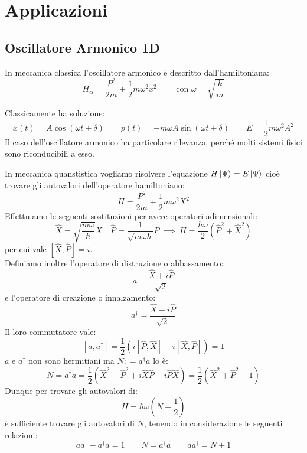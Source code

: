 

\section{Applicazioni}

\subsection{Oscillatore Armonico 1D} 
In meccanica classica l'oscillatore armonico è descritto dall'hamiltoniana:
\[
    H_{cl} = \frac{P^2}{2m} + \frac{1}{2}m \omega^2 x^2 \qquad \text{ con } \omega = \sqrt{\frac{k}{m}}
\]

Classicamente ha soluzione:
\[
    x(t) = A\cos(\omega t + \delta) \qquad p(t) = - m\omega A \sin(\omega t + \delta) \qquad E = \frac{1}{2} m \omega^2 A^2
\]
Il caso dell'oscillatore armonico ha particolare rilevanza, perché molti sistemi fisici sono riconducibili a esso.

In meccanica quanstistica vogliamo risolvere l'equazione \(H\ket{\Psi} = E\ket{\Psi}\) cioè trovare gli autovalori dell'operatore hamiltoniano:
\begin{equation}
    H = \frac{P^2}{2m} + \frac{1}{2} m \omega^2 X^2
\end{equation}
Effettuiamo le seguenti sostituzioni per avere operatori adimensionali:
\begin{equation}
    \hat{X} = \sqrt{\frac{m\omega}{\hbar}}X \quad \hat{P} = \frac{1}{\sqrt{m\omega \hbar}}P  \
        \implies  \ H = \frac{\hbar \omega}{2} ( \hat{P}^2 + \hat{X}^2)
\end{equation}
per cui vale \(\left[ \hat{X}, \hat{P} \right]= i\).\\
Definiamo inoltre l'operatore di distruzione o abbassamento:
\begin{equation}
    a = \frac{\hat{X}+ i\hat{P}}{\sqrt{2}}
\end{equation}
e l'operatore di creazione o innalzamento:
\begin{equation}
    a^\dagger = \frac{\hat{X}-i \hat{P}}{\sqrt{2}}
\end{equation}
Il loro commutatore vale:
\begin{equation}
    \left[ a,a^\dagger \right] = \frac{1}{2}\left( i\left[ \hat{P},\hat{X} \right]-i\left[ \hat{X}, \hat{P} \right]\right)    = 1
\end{equation}
\(a\) e \(a^\dagger\) non sono hermitiani ma \(N : = a ^\dagger a\) lo è:
\begin{equation}
    N = a^\dagger a = \frac{1}{2}\left( \hat{X}^2+\hat{P}^2 + i \hat{X}\hat{P} - i\hat{P}\hat{X}\right) = \frac{1}{2}\left( \hat{X}^2 + \hat{P}^2-1\right)
\end{equation}
Dunque per trovare gli autovalori di:
\[
    H = \hbar\omega\left(N + \frac{1}{2}\right)
\]
è sufficiente trovare gli autovalori di \(N\), tenendo in considerazione le seguenti relazioni:
\[
    aa^\dagger - a^\dagger a = 1 \qquad N = a^\dagger a \qquad aa^\dagger = N+1
\]

